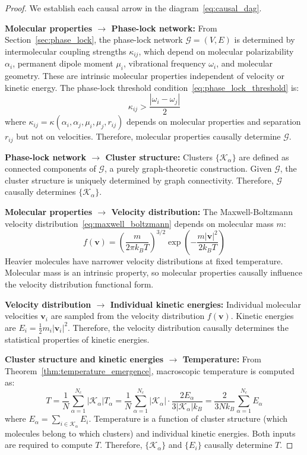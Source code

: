 \documentclass[12pt,a4paper]{article}
\theoremstyle{definition}
\theoremstyle{remark}
\newcommand{\phaselockgraph}{\mathcal{G}}
\begin{document}
\begin{proof}
We establish each causal arrow in the diagram~\eqref{eq:causal_dag}.

\textbf{Molecular properties $\to$ Phase-lock network:}
From Section~\ref{sec:phase_lock}, the phase-lock network $\phaselockgraph = (V, E)$ is determined by intermolecular coupling strengths $\kappa_{ij}$, which depend on molecular polarizability $\alpha_i$, permanent dipole moment $\mu_i$, vibrational frequency $\omega_i$, and molecular geometry. These are intrinsic molecular properties independent of velocity or kinetic energy. The phase-lock threshold condition~\eqref{eq:phase_lock_threshold} is:
\begin{equation}
\kappa_{ij} > \frac{|\omega_i - \omega_j|}{2}
\end{equation}
where $\kappa_{ij} = \kappa(\alpha_i, \alpha_j, \mu_i, \mu_j, r_{ij})$ depends on molecular properties and separation $r_{ij}$ but not on velocities. Therefore, molecular properties causally determine $\phaselockgraph$.

\textbf{Phase-lock network $\to$ Cluster structure:}
Clusters $\{\mathcal{K}_\alpha\}$ are defined as connected components of $\phaselockgraph$, a purely graph-theoretic construction. Given $\phaselockgraph$, the cluster structure is uniquely determined by graph connectivity. Therefore, $\phaselockgraph$ causally determines $\{\mathcal{K}_\alpha\}$.

\textbf{Molecular properties $\to$ Velocity distribution:}
The Maxwell-Boltzmann velocity distribution~\eqref{eq:maxwell_boltzmann} depends on molecular mass $m$:
\begin{equation}
f(\mathbf{v}) = \left(\frac{m}{2\pi k_B T}\right)^{3/2} \exp\left(-\frac{m|\mathbf{v}|^2}{2k_B T}\right)
\end{equation}
Heavier molecules have narrower velocity distributions at fixed temperature. Molecular mass is an intrinsic property, so molecular properties causally influence the velocity distribution functional form.

\textbf{Velocity distribution $\to$ Individual kinetic energies:}
Individual molecular velocities $\mathbf{v}_i$ are sampled from the velocity distribution $f(\mathbf{v})$. Kinetic energies are $E_i = \frac{1}{2} m_i |\mathbf{v}_i|^2$. Therefore, the velocity distribution causally determines the statistical properties of kinetic energies.

\textbf{Cluster structure and kinetic energies $\to$ Temperature:}
From Theorem~\ref{thm:temperature_emergence}, macroscopic temperature is computed as:
\begin{equation}
T = \frac{1}{N} \sum_{\alpha=1}^{N_c} |\mathcal{K}_\alpha| T_\alpha = \frac{1}{N} \sum_{\alpha=1}^{N_c} |\mathcal{K}_\alpha| \cdot \frac{2 E_\alpha}{3 |\mathcal{K}_\alpha| k_B} = \frac{2}{3 N k_B} \sum_{\alpha=1}^{N_c} E_\alpha
\end{equation}
where $E_\alpha = \sum_{i \in \mathcal{K}_\alpha} E_i$. Temperature is a function of cluster structure (which molecules belong to which clusters) and individual kinetic energies. Both inputs are required to compute $T$. Therefore, $\{\mathcal{K}_\alpha\}$ and $\{E_i\}$ causally determine $T$.


\end{proof}
\end{document}
